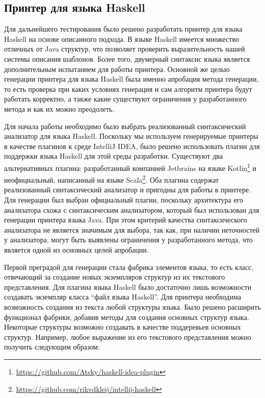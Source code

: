\subsection{Принтер для языка Haskell}

Для дальнейшего тестирования было решено разработать принтер для языка Haskell на основе описанного подхода. В языке Haskell имеется множество отличных от Java структур, что позволяет проверить выразительность нашей системы описания шаблонов. Более того, двумерный синтаксис языка является дополнительным испытанием для работы принтера. Основной же целью генерации принтера для языка Haskell была именно апробация метода генерации, то есть проверка при каких условиях генерация и сам алгоритм принтера будут работать корректно, а также какие существуют ограничения у разработанного метода и как их можно преодолеть. 

Для начала работы необходимо было выбрать реализованный синтаксический анализатор для языка Haskell. Поскольку мы используем генерируемые принтеры в качестве плагинов к среде IntelliJ IDEA, было решено использовать плагин для поддержки языка Haskell для этой среды разработки. Существуют два альтернативных плагина: разработанный компанией Jetbrains на языке Kotlin\footnote{\url{https://github.com/Atsky/haskell-idea-plugin}} и неофициальный, написанный на языке Scala\footnote{\url{https://github.com/rikvdkleij/intellij-haskell}}. Оба плагина содержат реализованный синтаксический анализатор и пригодны для работы в принтере. Для генерации был выбран официальный плагин, поскольку архитектура его анализатора схожа с синтаксическим анализатором, который был использован для генерации принтера языка Java. При этом критерий качества синтаксического анализатора не является значимым для выбора, так как, при наличии неточностей у анализатора, могут быть выявлены ограничения у разработанного метода, что является одной из основных целей апробации. 

Первой преградой для генерации стала фабрика элементов языка, то есть класс, отвечающий за создание новых экземпляров структур из их текстового представления. Для плагина языка Haskell было достаточно лишь возможности создавать экземпляр класса ``файл языка Haskell''. Для принтера необходима возможность создания из текста любой структуры языка. Было решено расширить функционал фабрики, добавив методы для создания основных структур языка. Некоторые структуры возможно создавать в качестве поддеревьев основных структур. Например, любое выражение из его текстового представления можно получить следующим образом:


